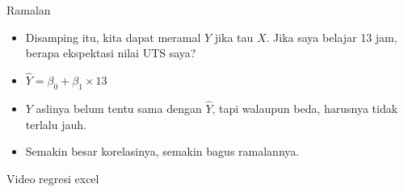 \documentclass[
  ignorenonframetext,
]{beamer}
\begin{document}
\begin{frame}{Ramalan}
\label{ramalan}
\begin{itemize}
\item
  Disamping itu, kita dapat meramal \(Y\) jika tau \(X\). Jika saya
  belajar 13 jam, berapa ekspektasi nilai UTS saya?
\item
  \(\hat{Y}=\beta_0+\beta_1 \times 13\)
\item
  \(Y\) aslinya belum tentu sama dengan \(\hat{Y}\), tapi walaupun beda,
  harusnya tidak terlalu jauh.
\item
  Semakin besar korelasinya, semakin bagus ramalannya.
\end{itemize}
\end{frame}

\begin{frame}{Video regresi excel}
\label{video-regresi-excel}
\end{frame}
\end{document}
